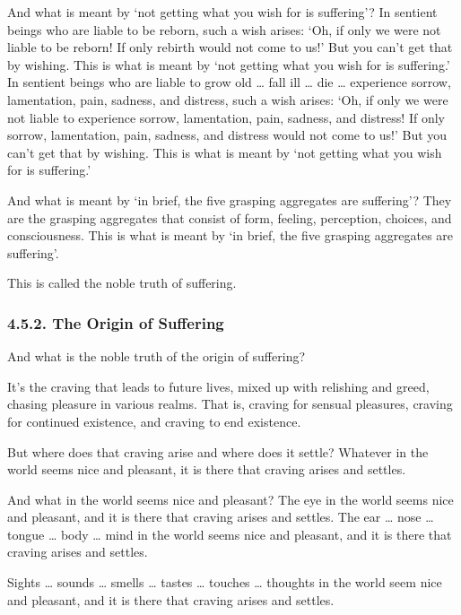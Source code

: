 \documentclass[12pt,openany]{book}%
\begin{document}
And what is meant by ‘not getting what you wish for is suffering’? In sentient beings who are liable to be reborn, such a wish arises: ‘Oh, if only we were not liable to be reborn! If only rebirth would not come to us!’ But you can’t get that by wishing. This is what is meant by ‘not getting what you wish for is suffering.’ In sentient beings who are liable to grow old … fall ill … die … experience sorrow, lamentation, pain, sadness, and distress, such a wish arises: ‘Oh, if only we were not liable to experience sorrow, lamentation, pain, sadness, and distress! If only sorrow, lamentation, pain, sadness, and distress would not come to us!’ But you can’t get that by wishing. This is what is meant by ‘not getting what you wish for is suffering.’ 

And what is meant by ‘in brief, the five grasping aggregates are suffering’? They are the grasping aggregates that consist of form, feeling, perception, choices, and consciousness. This is what is meant by ‘in brief, the five grasping aggregates are suffering’. 

This is called the noble truth of suffering. 

\subsubsection*{4.5.2. The Origin of Suffering }

And what is the noble truth of the origin of suffering? 

It’s the craving that leads to future lives, mixed up with relishing and greed, chasing pleasure in various realms. That is, craving for sensual pleasures, craving for continued existence, and craving to end existence. 

But where does that craving arise and where does it settle? Whatever in the world seems nice and pleasant, it is there that craving arises and settles. 

And what in the world seems nice and pleasant? The eye in the world seems nice and pleasant, and it is there that craving arises and settles. The ear … nose … tongue … body … mind in the world seems nice and pleasant, and it is there that craving arises and settles. 

Sights … sounds … smells … tastes … touches … thoughts in the world seem nice and pleasant, and it is there that craving arises and settles. 
\end{document}
